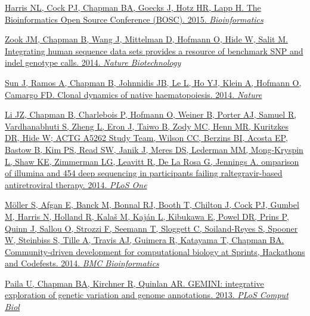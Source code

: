 \documentclass[10pt]{article}
\makeatletter
\newlength{\bibhang}
\newlength{\bibsep}
 {\@listi \global\bibsep\itemsep \global\advance\bibsep by\parsep}
\newenvironment{bibsection}%
        {\vspace{-\baselineskip}\begin{list}{}{%
       \setlength{\leftmargin}{\bibhang}%
       \setlength{\itemindent}{-\leftmargin}%
       \setlength{\itemsep}{\bibsep}%
       \setlength{\parsep}{\z@}%
        \setlength{\partopsep}{0pt}%
        \setlength{\topsep}{0pt}}}
        {\end{list}\vspace{-.6\baselineskip}}
\makeatother
\begin{document}
\begin{bibsection}
 \item \href{http://bioinformatics.oxfordjournals.org/content/31/2/299.long}
    {Harris NL, Cock PJ, Chapman BA, Goecks J, Hotz HR, Lapp H.
     The Bioinformatics Open Source Conference (BOSC). 2015.
     \textit{Bioinformatics}}

 \item \href{http://www.nature.com/nbt/journal/v32/n3/full/nbt.2835.html}
   {Zook JM, Chapman B, Wang J, Mittelman D, Hofmann O, Hide W, Salit M.
    Integrating human sequence data sets provides a resource of benchmark SNP
    and indel genotype calls. 2014. \textit{Nature Biotechnology}}

  \item \href{http://www.nature.com/nature/journal/v514/n7522/full/nature13824.html}
    {Sun J, Ramos A, Chapman B, Johnnidis JB, Le L, Ho YJ, Klein A, Hofmann O,
     Camargo FD.
     Clonal dynamics of native haematopoiesis. 2014.
     \textit{Nature}}

  \item \href{http://journals.plos.org/plosone/article?id=10.1371/journal.pone.0090485}
    {Li JZ, Chapman B, Charlebois P, Hofmann O, Weiner B, Porter AJ, Samuel R,
     Vardhanabhuti S, Zheng L, Eron J, Taiwo B, Zody MC, Henn MR, Kuritzkes DR,
     Hide W; ACTG A5262 Study Team, Wilson CC, Berzins BI, Acosta EP, Bastow B,
     Kim PS, Read SW, Janik J, Meres DS, Lederman MM, Mong-Kryspin L, Shaw KE,
     Zimmerman LG, Leavitt R, De La Rosa G, Jennings A.
     omparison of illumina and 454 deep sequencing in participants failing
     raltegravir-based antiretroviral therapy. 2014.
     \textit{PLoS One}}

  \item \href{http://www.biomedcentral.com/1471-2105/15/S14/S7}
    {Möller S, Afgan E, Banck M, Bonnal RJ, Booth T, Chilton J, Cock PJ, Gumbel
     M, Harris N, Holland R, Kalaš M, Kaján L, Kibukawa E, Powel DR, Prins P,
     Quinn J, Sallou O, Strozzi F, Seemann T, Sloggett C, Soiland-Reyes S,
     Spooner W, Steinbiss S, Tille A, Travis AJ, Guimera R, Katayama T, Chapman
     BA.
     Community-driven development for computational biology at Sprints,
     Hackathons and Codefests. 2014.
     \textit{BMC Bioinformatics}}

  \item \href{http://journals.plos.org/ploscompbiol/article?id=10.1371/journal.pcbi.1003153}
    {Paila U, Chapman BA, Kirchner R, Quinlan AR.
     GEMINI: integrative exploration of genetic variation and genome
     annotations. 2013. \textit{PLoS Comput Biol}}


\end{bibsection}
\end{document}
